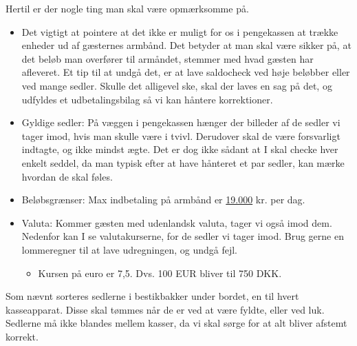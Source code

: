 Hertil er der nogle ting man skal være opmærksomme på.
\begin{itemize}
  \item Det vigtigt at pointere at det ikke er muligt for 
  os i pengekassen at trække enheder ud af gæsternes armbånd.
  Det betyder at man skal være sikker på, at det beløb man overfører til armåndet, 
  stemmer med hvad gæsten har afleveret. Et tip til at undgå det, er
  at lave saldocheck ved høje beløbber eller ved mange sedler.
  Skulle det alligevel ske, skal der laves en sag på det, og udfyldes et
  udbetalingsbilag så vi kan håntere korrektioner.
  \item Gyldige sedler: På væggen i pengekassen hænger der billeder af de sedler vi tager imod, 
  hvis man skulle være i tvivl. Derudover skal de være forsvarligt indtagte, og ikke mindst ægte. 
  Det er dog ikke sådant at I skal checke hver enkelt seddel, da man typisk efter at have 
  hånteret et par sedler, kan mærke hvordan de skal føles.
  \item Beløbsgrænser: Max indbetaling på armbånd er \underline{19.000} kr. per dag.
  \item Valuta: Kommer gæsten med udenlandsk valuta, tager vi også imod dem. Nedenfor 
  kan I se valutakurserne, for de sedler vi tager imod. Brug gerne en lommeregner til 
  at lave udregningen, og undgå fejl.
  \begin{itemize}
    \item Kursen på euro er 7,5. Dvs. 100 EUR bliver til 750 DKK.
  \end{itemize}
\end{itemize}

Som nævnt sorteres sedlerne i bestikbakker under bordet, en til hvert kasseapparat. 
Disse skal tømmes når de er ved at være fyldte, eller ved luk. Sedlerne må ikke blandes mellem kasser, 
da vi skal sørge for at alt bliver afstemt korrekt.

